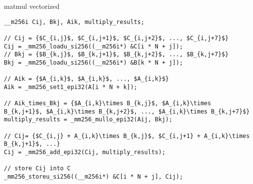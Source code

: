 \begin{frame}[fragile,label=sqVectCode]{matmul vectorized}
\begin{lstlisting}
__m256i Cij, Bkj, Aik, multiply_results;

// Cij = {$C_{i,j}$, $C_{i,j+1}$, $C_{i,j+2}$, ..., $C_{i,j+7}$}
Cij = _mm256_loadu_si256((__m256i*) &C[i * N + j]);
// Bkj = {$B_{k,j}$, $B_{k,j+1}$, $B_{k,j+2}$, ..., $B_{k,j+7}$}
Bkj = _mm256_loadu_si256((__m256i*) &B[k * N + j]);

// Aik = {$A_{i,k}$, $A_{i,k}$, ..., $A_{i,k}$}
Aik = _mm256_set1_epi32(A[i * N + k]);

// Aik_times_Bkj = {$A_{i,k}\times B_{k,j}$, $A_{i,k}\times B_{k,j+1}$, $A_{i,k}\times B_{k,j+2}$, ..., $A_{i,k}\times B_{k,j+7}$}
multiply_results = _mm256_mullo_epi32(Aij, Bkj);

// Cij= {$C_{i,j} + A_{i,k}\times B_{k,j}$, $C_{i,j+1} + A_{i,k}\times B_{k,j+1}$, ...}
Cij = _mm256_add_epi32(Cij, multiply_results);

// store Cij into C
_mm256_storeu_si256((__m256i*) &C[i * N + j], Cij);
\end{lstlisting}
\end{frame}

